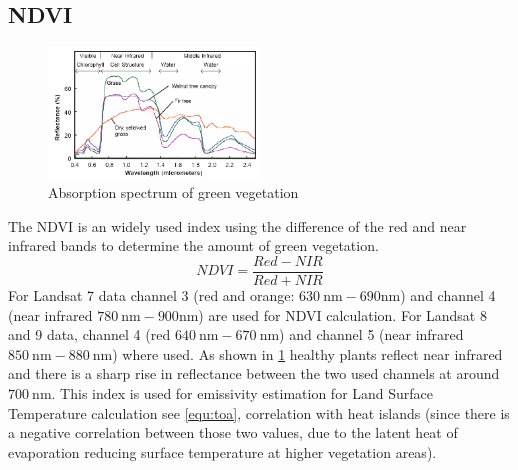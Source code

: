 \subsection{NDVI}
%
\noindent
\begin{figure}[!htbp]
    \centering
    \includegraphics[width=0.5\textwidth]{img/Reflectance-spectra-of-different-types-of-green-vegetation-compared-to-a-spectral.png}
    \caption{Absorption spectrum of green vegetation\cite[Fig. 2]{Govender2007}\label{fig:absorbtionVeg}}
\end{figure}
The \gls{NDVI} is an widely used index using the difference of the red and near infrared bands to determine the amount of green vegetation. 
\begin{equation}
    NDVI = \frac{Red-NIR}{Red+NIR}
    \label{equ:ndvi}
\end{equation}
For Landsat 7 data channel 3 (red and orange: $630\ \text{nm} - 690 \text{nm}$) and channel 4 (near infrared $780\ \text{nm} - 900 \text{nm}$) are used for \gls{NDVI} calculation.  
For Landsat 8 and 9 data, channel 4 (red $640\ \text{nm} - 670\ \text{nm}$) and channel 5 (near infrared $850\ \text{nm} - 880\ \text{nm}$) where used.
As shown in \cref{fig:absorbtionVeg} healthy plants reflect near infrared and there is a sharp rise in reflectance between the two used channels at around $700\ \text{nm}$. 
%
This index is used for emissivity estimation for Land Surface Temperature calculation see \cref{equ:toa}, correlation with heat islands (since there is a negative correlation between those two values, due to the latent heat of evaporation reducing surface temperature at higher vegetation areas).
